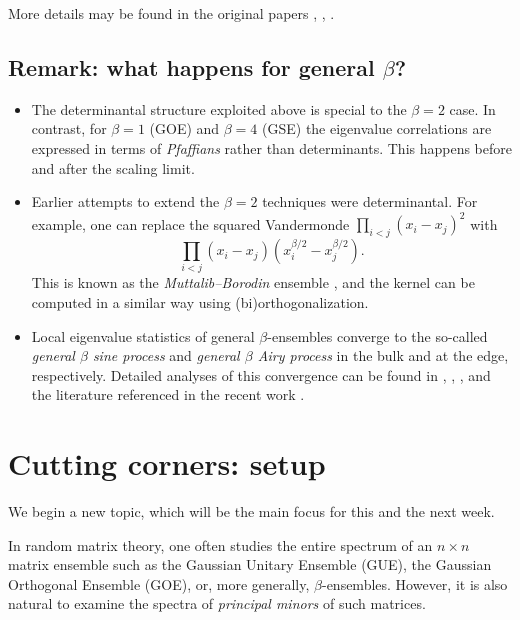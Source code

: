 \documentclass[letterpaper,11pt,oneside,reqno]{book}
\numberwithin{equation}{chapter}  %
\theoremstyle{definition}
\begin{document}
More details
may be found in the original papers
\cite{tracy1993level},
\cite{Forrester1993},
\cite{tracy_widom1994level_airy}.



\subsection{Remark: what happens for general \texorpdfstring{\(\beta\)}{beta}?}

\begin{itemize}
    \item The determinantal structure exploited above is special to the $\beta=2$ case. In contrast, for $\beta=1$ (GOE) and $\beta=4$ (GSE) the eigenvalue correlations are expressed in terms of \emph{Pfaffians} rather than determinants.
			This happens before and after the scaling limit.
		\item
			Earlier attempts to extend the $\beta=2$ techniques
			were determinantal. For example, one can replace the
			squared Vandermonde $\prod_{i<j} (x_i-x_j)^2$ with
			\begin{equation*}
			 \prod_{i<j} (x_i-x_j)(x_i^{\beta/2}-x_j^{\beta/2}).
			\end{equation*}
			This is known as the \emph{Muttalib--Borodin} ensemble
			\cite{forrester2017},
			and the kernel can be computed in a similar way using (bi)orthogonalization.
		\item Local eigenvalue statistics of general $\beta$-ensembles converge to the so-called
			\emph{general $\beta$ sine process}
			and
			\emph{general $\beta$ Airy process}
			in the bulk and at the edge, respectively.
			Detailed analyses of this convergence can be found in
			\cite{RamirezRiderVirag2006RandomAiry},
			\cite{valko2009continuum},
			\cite{gorin2018stochastic},
			and the literature referenced in the recent work
			\cite{gorin2024airy}.
\end{itemize}

\section{Cutting corners: setup}

We begin a new topic, which will be the main focus for this and the next week.

In random matrix theory, one often studies the entire spectrum of an $n\times n$ matrix ensemble such as the Gaussian Unitary Ensemble (GUE), the Gaussian Orthogonal Ensemble (GOE), or, more generally, $\beta$-ensembles. However, it is also natural to examine the spectra of \emph{principal minors} of such matrices.
\end{document}
